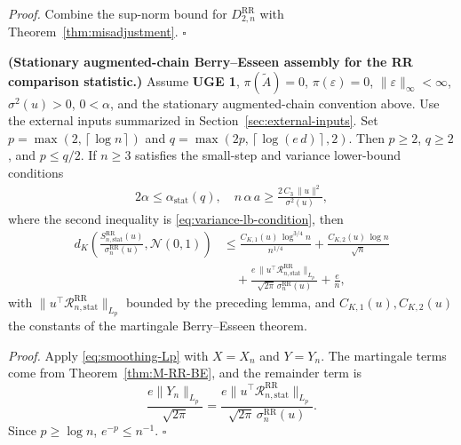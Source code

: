 \textit{Proof.} Combine the sup-norm bound for \(D_{2,n}^{\text{RR}}\) with
Theorem~\ref{thm:misadjustment}. \(\square\)

\begin{theorem}\label{thm:RR-BE}
  \textbf{(Stationary augmented-chain Berry--Esseen assembly for the RR comparison statistic.)}
  Assume \textbf{UGE 1}, \(\pi(\widetilde{A}) = 0\), \(\pi(\varepsilon) = 0\),
  \(\lVert  \varepsilon  \rVert_\infty < \infty\), \(\sigma^2(u) > 0\),
  \(0 < \alpha\), and the stationary augmented-chain
  convention above. Use the external inputs summarized in
  Section~\ref{sec:external-inputs}. Set
  \(p = \max(2, \left\lceil \log n \right\rceil)\) and \(q = \max(2 p, \left\lceil \log(e \, d) \right\rceil, 2)\).
  Then \(p \ge 2\), \(q \ge 2\), and \(p \le q / 2\). If \(n \ge 3\) satisfies the
  small-step and variance lower-bound conditions
\begin{equation}
\begin{aligned}
  2 \alpha \le \alpha_{\text{stat}}(q),
  \quad
  n \, \alpha \, a \ge \frac{2 \, C_3 \, \lVert  u  \rVert^2}{\sigma^2(u)},
\end{aligned}
\label{eq:RR-BE-master-conditions}
\end{equation}
  where the second inequality is \eqref{eq:variance-lb-condition}, then
\begin{equation}
\begin{aligned}
  d_K \left(
    \frac{S_{n, \text{stat}}^{\text{RR}}(u)}{\sigma_n^{\text{RR}}(u)},
    \mathcal{N}(0, 1)
  \right)
    &\le \frac{C_{K, 1}(u) \, \log^{3 / 4} n}{n^{1 / 4}}
     + \frac{C_{K, 2}(u) \, \log n}{\sqrt{n}} \\
    &\quad + \frac{e \, \lVert  u^\top \mathcal{R}_{n, \text{stat}}^{\text{RR}}  \rVert_{L_p}}{\sqrt{2 \pi} \, \sigma_n^{\text{RR}}(u)}
     + \frac{e}{n},
\end{aligned}
\label{eq:RR-BE-master}
\end{equation}
  with \(\lVert  u^\top \mathcal{R}_{n, \text{stat}}^{\text{RR}}  \rVert_{L_p}\) bounded by the preceding
  lemma, and \(C_{K, 1}(u), C_{K, 2}(u)\) the constants of the martingale
  Berry--Esseen theorem.
\end{theorem}

\textit{Proof.} Apply \eqref{eq:smoothing-Lp} with \(X = X_n\) and \(Y = Y_n\). The martingale
terms come from Theorem~\ref{thm:M-RR-BE}, and the remainder term is
\[
\frac{e\lVert Y_n\rVert_{L_p}}{\sqrt{2\pi}}
  =
\frac{e\lVert u^\top\mathcal{R}_{n,\mathrm{stat}}^{\mathrm{RR}}\rVert_{L_p}}
     {\sqrt{2\pi}\,\sigma_n^{\mathrm{RR}}(u)}.
\]
Since \(p\ge\log n\),
\(e^{-p} \le n^{-1}\). \(\square\)

